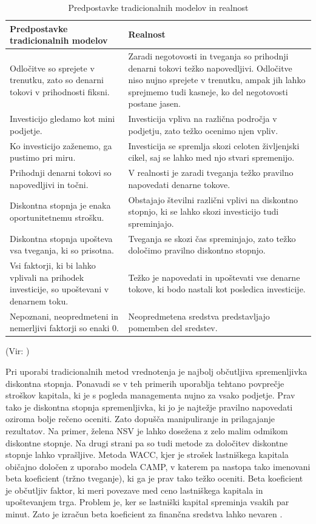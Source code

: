 \pagebreak
\begin{table}[ht]
	\caption{Predpostavke tradicionalnih modelov in realnost}
	\centering
	\begin{tabular}{|L|L|}
	\hline
	\textbf{Predpostavke tradicionalnih modelov} & \textbf{Realnost} \\
	\hline
	\hline
	Odločitve so sprejete v trenutku, zato so denarni tokovi v prihodnosti fiksni. & Zaradi negotovosti in tveganja so prihodnji denarni tokovi težko napovedljivi. Odločitve niso nujno sprejete v trenutku, ampak jih lahko sprejmemo tudi kasneje, ko del negotovosti postane jasen. \\
	\hline
	Investicijo gledamo kot mini podjetje. &  Investicija vpliva na različna področja v podjetju, zato težko ocenimo njen vpliv. \\
	\hline
	Ko investicijo zaženemo, ga pustimo pri miru. & Investicija se spremlja skozi celoten življenjski cikel, saj se lahko med njo stvari spremenijo. \\
	\hline
	Prihodnji denarni tokovi so napovedljivi in točni. & V realnosti je zaradi tveganja težko pravilno napovedati denarne tokove. \\
	\hline
	Diskontna stopnja je enaka oportunitetnemu strošku. & Obstajajo številni različni vplivi na diskontno stopnjo, ki se lahko skozi investicijo tudi spreminjajo.\\
	\hline
	Diskontna stopnja upošteva vsa tveganja, ki so prisotna. & Tveganja se skozi čas spreminjajo, zato težko določimo pravilno diskontno stopnjo. \\
	\hline
	Vsi faktorji, ki bi lahko vplivali na prihodek investicije, so upoštevani v denarnem toku. & Težko je napovedati in upoštevati vse denarne tokove, ki bodo nastali kot posledica investicije. \\
	\hline
	Nepoznani, neopredmeteni in nemerljivi faktorji so enaki 0. & Neopredmetena sredstva predstavljajo pomemben del sredstev. \\
	\hline
	\end{tabular}
\end{table} 
(Vir: \cite[str. 67]{Mun})



Pri uporabi tradicionalnih metod vrednotenja je najbolj občutljiva spremenljivka diskontna stopnja. Ponavadi se v teh primerih uporablja tehtano povprečje stroškov kapitala, ki je s pogleda managementa nujno za vsako podjetje. Prav tako je diskontna stopnja spremenljivka, ki jo je najtežje pravilno napovedati oziroma bolje rečeno oceniti. Zato dopušča manipuliranje in prilagajanje rezultatov. Na primer, želena NSV je lahko dosežena z zelo malim odmikom diskontne stopnje. Na drugi strani pa so tudi metode za določitev diskontne stopnje lahko vprašljive. Metoda WACC, kjer je strošek lastniškega kapitala običajno določen z uporabo modela CAMP, v katerem pa nastopa tako imenovani beta koeficient (tržno tveganje), ki ga je prav tako težko oceniti. Beta koeficient je občutljiv faktor, ki meri povezave med ceno lastniškega kapitala in upoštevanjem trga. Problem je, ker se lastniški kapital spreminja vsakih par minut. Zato je izračun beta koeficient za finančna sredstva lahko nevaren \cite[str. 69, 70]{Mun}.\\
 
